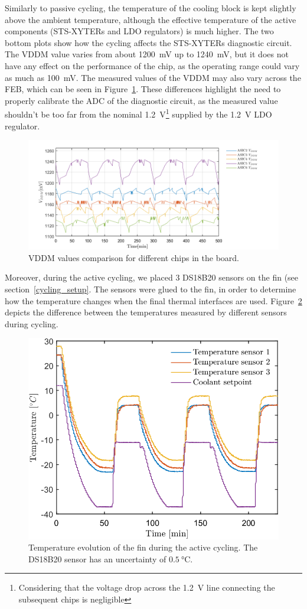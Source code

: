 Similarly to passive cycling, the temperature of the cooling block is kept slightly above the ambient temperature, although the effective temperature of the active components (STS-XYTERs and \gls{LDO} regulators) is much higher. The two bottom plots show how the cycling affects the STS-XYTERs diagnostic circuit. The VDDM value varies from about 1200~mV up to 1240~mV, but it does not have any effect on the performance of the chip, as the operating range could vary as much as 100~mV. The measured values of the VDDM may also vary across the \gls{FEB}, which can be seen in Figure~\ref{feb_vary}. These differences highlight the need to properly calibrate the ADC of the diagnostic circuit, as the measured value shouldn't be too far from the nominal 1.2~V\footnote{Considering that the voltage drop across the 1.2~V line connecting the subsequent chips is negligible} supplied by the 1.2~V \gls{LDO} regulator. 
\begin{figure}[!h]
\centering
\includegraphics[width=0.9\columnwidth]{Chapter4/images/vddm_comp.png}
\caption{VDDM values comparison for different chips in the board.}
\label{feb_vary}
\end{figure}

Moreover, during the active cycling, we placed 3 DS18B20 sensors on the fin (see section~\ref{cycling_setup}. The sensors were glued to the fin, in order to determine how the temperature changes when the final thermal interfaces are used. Figure~\ref{fig_active_sensors} depicts the difference between the temperatures measured by different sensors during cycling. 

\begin{figure}[!h]
\centering
\includegraphics[width=0.5\columnwidth]{Chapter4/images/active.png}
\caption{Temperature evolution of the fin during the active cycling. The DS18B20 \cite{DS18B20} sensor has an uncertainty of $\SI{0.5}{\celsius}$.}
\label{fig_active_sensors}
\end{figure}


